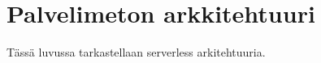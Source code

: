 \chapter{Palvelimeton arkkitehtuuri} \label{Palvelimeton arkkitehtuuri}

Tässä luvussa tarkastellaan serverless arkitehtuuria.


